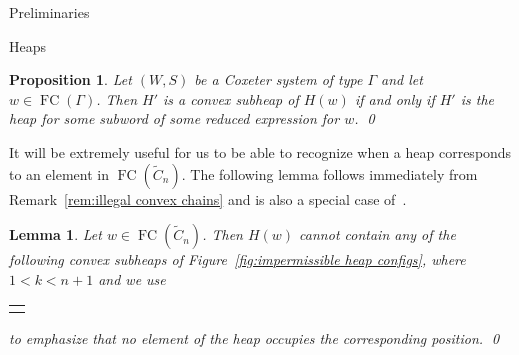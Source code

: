\documentclass[11pt]{amsart}
\newtheorem{lemma}[theorem]{Lemma}
\newtheorem{proposition}[theorem]{Proposition}
\theoremstyle{definition}
\numberwithin{equation}{section}
\newcommand{\C}{\widetilde{C}}
\renewcommand{\(}{\left(}
\renewcommand{\)}{\right)}
\DeclareMathOperator{\FC}{FC}
\newcommand\xxaxis{0}
\newcommand\yyaxis{90}
\newcommand\heapblank[2]{\fill[fill=white, dotted, draw=black, line width=1.1pt, rounded corners, shift={(\xxaxis:#1)},shift={(\yyaxis:#2)}] (-1,-0.5) rectangle (1,0.5);}
\begin{document}
\begin{section}{Preliminaries}
\begin{subsection}{Heaps}
\begin{proposition}
Let $(W,S)$ be a Coxeter system of type $\Gamma$ and let $w \in \FC(\Gamma)$. Then $H'$ is a convex subheap of $H(w)$ if and only if $H'$ is the heap for some subword of some reduced expression for $w$.   \qed
\end{proposition}

It will be extremely useful for us to be able to recognize when a heap corresponds to an element in $\FC(\C_{n})$.  The following lemma follows immediately from Remark~\ref{rem:illegal convex chains} and is also a special case of~\cite[Proposition 3.3]{Stembridge1996}.

\begin{lemma}\label{lem:impermissible heap configs}
Let $w \in \FC(\C_{n})$.  Then $H(w)$ cannot contain any of the following convex subheaps of Figure~\ref{fig:impermissible heap configs}, where $1<k<n+1$ and we use \begin{tabular}{c} \begin{tikzpicture}[scale=0.3] \heapblank{0}{0}; \end{tikzpicture} \end{tabular} to emphasize that no element of the heap occupies the corresponding position.  \qed
\end{lemma}


\end{subsection}
\end{section}
\end{document}
